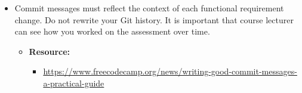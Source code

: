 \documentclass{article}
\begin{document}
\begin{itemize}
\begin{itemize}
	      \end{itemize}
	\item Commit messages must reflect the context of each functional requirement change. Do not rewrite your Git history. It is important that course lecturer can see how you worked on the assessment over time.
	      \begin{itemize}
	      	\item \textbf{Resource:} 
	      	      \begin{itemize}
	      	      	\item \footnotesize\href{https://www.freecodecamp.org/news/writing-good-commit-messages-a-practical-guide}{https://www.freecodecamp.org/news/writing-good-commit-messages-a-practical-guide}
	      	      \end{itemize}
	      \end{itemize}
\end{itemize}
\end{document}
